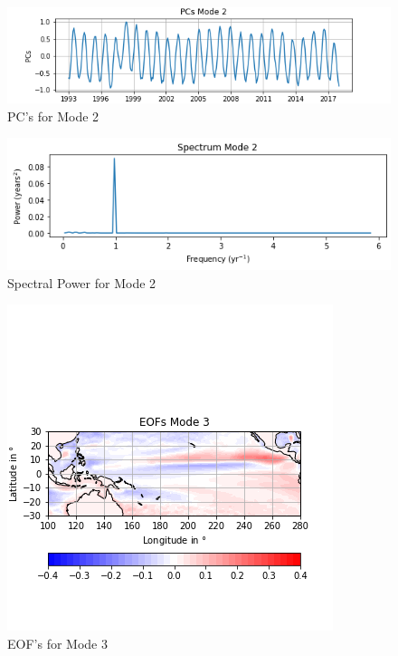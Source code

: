 \documentclass{article}
\begin{document}
\begin{figure}[b!]
\centering
\includegraphics[width=1.0\linewidth]{PCsmode2.png}
\caption{PC's for Mode 2}
\label{fig:PC2}
\end{figure}

\begin{figure}[b!]
\centering
\includegraphics[width=1.0\linewidth]{Spectrum2.png}
\caption{Spectral Power for Mode 2}
\label{fig:PC2}
\end{figure}

\begin{figure}[b!]
\centering
\includegraphics[width=1.0\linewidth]{EOFmode3.png}
\caption{EOF's for Mode 3}
\label{fig:EOF3}
\end{figure}
\end{document}
